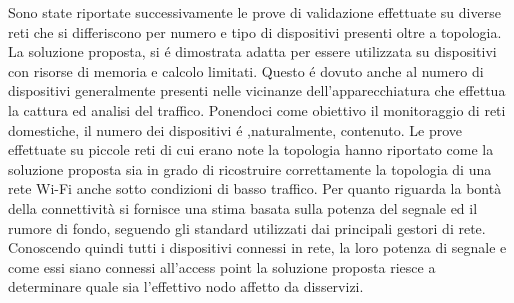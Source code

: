Sono state riportate successivamente le prove di validazione effettuate su diverse reti che si differiscono per numero e tipo di dispositivi presenti oltre a topologia.
La soluzione proposta, si \'e dimostrata adatta per essere utilizzata su dispositivi con risorse di memoria e calcolo limitati.
Questo \'e dovuto anche al numero di dispositivi generalmente presenti nelle vicinanze dell'apparecchiatura che effettua la cattura ed analisi del traffico.
Ponendoci come obiettivo il monitoraggio di reti domestiche, il numero dei dispositivi \'e ,naturalmente, contenuto.
Le prove effettuate su piccole reti di cui erano note la topologia hanno riportato come la soluzione proposta sia in grado di ricostruire correttamente la topologia di una rete Wi-Fi anche sotto condizioni di basso traffico.
Per quanto riguarda la bont\`a della connettivit\`a si fornisce una stima basata sulla potenza del segnale ed il rumore di fondo, seguendo gli standard utilizzati dai principali gestori di rete.
Conoscendo quindi tutti i dispositivi connessi in rete, la loro potenza di segnale e  come essi siano connessi all'access point la soluzione proposta riesce a determinare  quale sia l'effettivo nodo affetto da disservizi.